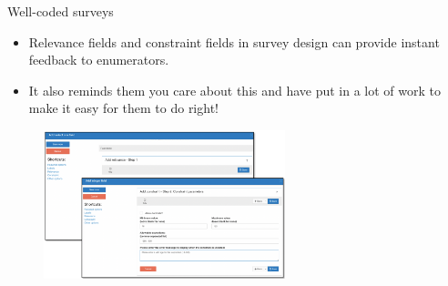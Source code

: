 \documentclass[aspectratio=169]{beamer}
\begin{document}
\begin{frame}[fragile]{Well-coded surveys}
\begin{multicols}{2}	
	
	\begin{itemize}[<default overlay specification>]
		\item<1> Relevance fields and constraint fields in survey design can provide instant feedback to enumerators.
		\item<1> It also reminds them you care about this and have put in a lot of work to make it easy for them to do right!
	\end{itemize}
	
	\begin{figure}
		\centering
		\includegraphics[width=70mm, right]{img/Survey}
	\end{figure}
	
\end{multicols}
\end{frame}
\end{document}
